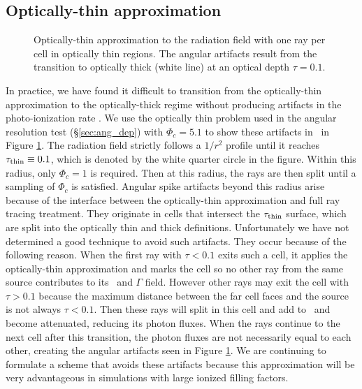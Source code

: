 \documentclass[useAMS,usenatbib]{mn2e}
\begin{document}
\subsection{Optically-thin approximation}

\begin{figure}
  \caption{\label{fig:rayopt} Optically-thin approximation to the
    radiation field with one ray per cell in optically thin regions.
    The angular artifacts result from the transition to optically
    thick (white line) at an optical depth $\tau = 0.1$.}
\end{figure}

In practice, we have found it difficult to transition from the
optically-thin approximation to the optically-thick regime without
producing artifacts in the photo-ionization rate \kph.  We use the
optically thin problem used in the angular resolution test
(\S\ref{sec:ang_dep}) with $\Phi_c = 5.1$ to show these artifacts in
\kph~in Figure \ref{fig:rayopt}.  The radiation field strictly follows
a $1/r^2$ profile until it reaches $\tau_{\rm thin} \equiv 0.1$, which
is denoted by the white quarter circle in the figure.  Within this
radius, only $\Phi_c = 1$ is required.  Then at this radius, the rays
are then split until a sampling of $\Phi_c$ is satisfied.  Angular
spike artifacts beyond this radius arise because of the interface
between the optically-thin approximation and full ray tracing
treatment.  They originate in cells that intersect the $\tau_{\rm
  thin}$ surface, which are split into the optically thin and thick
definitions.  Unfortunately we have not determined a good technique to
avoid such artifacts.  They occur because of the following reason.
When the first ray with $\tau < 0.1$ exits such a cell, it applies the
optically-thin approximation and marks the cell so no other ray from
the same source contributes to its \kph~and $\Gamma$ field.  However
other rays may exit the cell with $\tau > 0.1$ because the maximum
distance between the far cell faces and the source is not always $\tau
< 0.1$.  Then these rays will split in this cell and add to \kph~and
become attenuated, reducing its photon fluxes.  When the rays continue
to the next cell after this transition, the photon fluxes are not
necessarily equal to each other, creating the angular artifacts seen
in Figure \ref{fig:rayopt}.  We are continuing to formulate a scheme
that avoids these artifacts because this approximation will be very
advantageous in simulations with large ionized filling factors.
\end{document}

